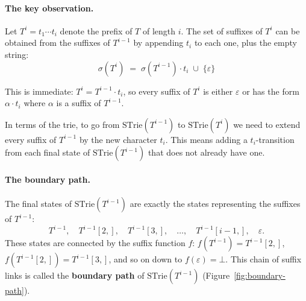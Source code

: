 
\paragraph{The key observation.}
Let $T^i = t_1 \cdots t_i$ denote the prefix of $T$ of length $i$.
The set of suffixes of $T^i$ can be obtained from the suffixes of
$T^{i-1}$ by appending $t_i$ to each one, plus the empty string:
\begin{equation}
  \label{eq:sigma-online}
  \boxed{\;\sigma(T^i) \;=\; \sigma(T^{i-1}) \cdot t_i
  \;\cup\; \{\varepsilon\}\;}
\end{equation}

\noindent
This is immediate: $T^i = T^{i-1} \cdot t_i$, so every suffix of $T^i$
is either $\varepsilon$ or has the form $\alpha \cdot t_i$ where
$\alpha$ is a suffix of $T^{i-1}$.

In terms of the trie, to go from $\mathrm{STrie}(T^{i-1})$ to
$\mathrm{STrie}(T^i)$ we need to extend every suffix of $T^{i-1}$
by the new character $t_i$.
This means adding a $t_i$-transition from each final state of
$\mathrm{STrie}(T^{i-1})$ that does not already have one.

\paragraph{The boundary path.}
The final states of $\mathrm{STrie}(T^{i-1})$ are exactly the
states representing the suffixes of $T^{i-1}$:
\[
  T^{i-1},\quad
  T^{i-1}[2{,}],\quad
  T^{i-1}[3{,}],\quad
  \ldots,\quad
  T^{i-1}[i{-}1{,}],\quad
  \varepsilon.
\]
These states are connected by the suffix function $f$:
$f(T^{i-1}) = T^{i-1}[2{,}]$,\;
$f(T^{i-1}[2{,}]) = T^{i-1}[3{,}]$,\; and so on down to
$f(\varepsilon) = \bot$.
This chain of suffix links is called the \textbf{boundary path} of
$\mathrm{STrie}(T^{i-1})$ (Figure~\ref{fig:boundary-path}).

